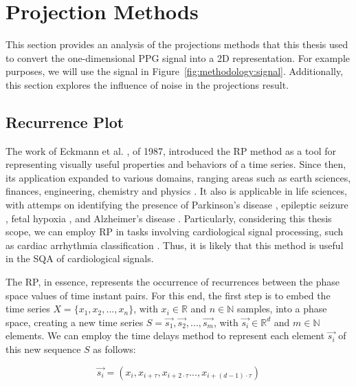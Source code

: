 



\section{Projection Methods}

This section provides an analysis of the projections methods that this thesis used to convert the one-dimensional \gls{PPG} signal into a 2D representation. For example purposes, we will use the signal in Figure~\ref{fig:methodology:signal}. Additionally, this section explores the influence of noise in the projections result. 



\subsection{Recurrence Plot}

The work of Eckmann et al. \cite{rp-1}, of 1987, introduced the \gls{RP} method as a tool for representing visually useful properties and behaviors of a time series. Since then, its application expanded to various domains, ranging areas such as earth sciences, finances, engineering, chemistry and physics \cite{rp-2}. It also is applicable in life sciences, with attemps on identifying the presence of Parkinson's disease \cite{rp-3}, epileptic seizure \cite{rp-4}, fetal hypoxia \cite{rp-5}, and Alzheimer's disease \cite{rp-6}. Particularly, considering this thesis scope, we can employ \gls{RP} in tasks involving cardiological signal processing, such as cardiac arrhythmia classification \cite{rp-7}. Thus, it is likely that this method is useful in the \gls{SQA} of cardiological signals.  

The \gls{RP}, in essence, represents the occurrence of recurrences between the phase space values of time instant pairs. For this end, the first step is to embed the time series $X=\{x_1,x_2,...,x_n\}$, with $ x_i \in \mathbb{R}$ and $n \in \mathbb{N}$ samples, into a phase space, creating a new time series $S=\vec{s_1},\vec{s_2},...,\vec{s_m}$, with $ \vec{s_i} \in \mathbb{R}^d$ and $m \in \mathbb{N}$ elements. We can employ the time delays method to represent each element $\vec{s_i}$ of this new sequence $S$ as follows:

\begin{equation}
    \vec{s_i} = (x_i, x_{i + \tau}, x_{i + 2\cdot \tau} ..., x_{i + (d-1) \cdot \tau})
\end{equation}   

